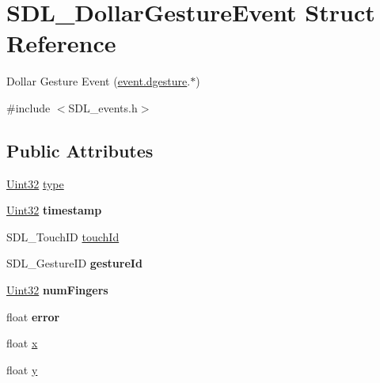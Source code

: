 \hypertarget{struct_s_d_l___dollar_gesture_event}{}\section{S\+D\+L\+\_\+\+Dollar\+Gesture\+Event Struct Reference}
\label{struct_s_d_l___dollar_gesture_event}


Dollar Gesture Event (\hyperlink{union_s_d_l___event_a4481167b9f8549aeb254e97ca812e74d}{event.\+dgesture}.$\ast$)  




{\ttfamily \#include $<$S\+D\+L\+\_\+events.\+h$>$}

\subsection*{Public Attributes}
\begin{DoxyCompactItemize}
\item 
\hyperlink{_s_d_l__stdinc_8h_add440eff171ea5f55cb00c4a9ab8672d}{Uint32} \hyperlink{struct_s_d_l___dollar_gesture_event_ac7f6948754a1b2eb36edde043bf75ce9}{type}
\item 
\hypertarget{struct_s_d_l___dollar_gesture_event_a3bccd8ebdf30b79c0f4074f6471ec583}{}\hyperlink{_s_d_l__stdinc_8h_add440eff171ea5f55cb00c4a9ab8672d}{Uint32} {\bfseries timestamp}\label{struct_s_d_l___dollar_gesture_event_a3bccd8ebdf30b79c0f4074f6471ec583}

\item 
S\+D\+L\+\_\+\+Touch\+I\+D \hyperlink{struct_s_d_l___dollar_gesture_event_a40402f6911ed0dba48e6b23aa02bd83d}{touch\+Id}
\item 
\hypertarget{struct_s_d_l___dollar_gesture_event_a68968438eae9e58208b14e8c954dec31}{}S\+D\+L\+\_\+\+Gesture\+I\+D {\bfseries gesture\+Id}\label{struct_s_d_l___dollar_gesture_event_a68968438eae9e58208b14e8c954dec31}

\item 
\hypertarget{struct_s_d_l___dollar_gesture_event_a14160d8bad8569f53dd18ed8f64d253f}{}\hyperlink{_s_d_l__stdinc_8h_add440eff171ea5f55cb00c4a9ab8672d}{Uint32} {\bfseries num\+Fingers}\label{struct_s_d_l___dollar_gesture_event_a14160d8bad8569f53dd18ed8f64d253f}

\item 
\hypertarget{struct_s_d_l___dollar_gesture_event_a30aaa8fe0df93615e6692aa20e9c13eb}{}float {\bfseries error}\label{struct_s_d_l___dollar_gesture_event_a30aaa8fe0df93615e6692aa20e9c13eb}

\item 
float \hyperlink{struct_s_d_l___dollar_gesture_event_a9888449bd8842ed96494b4db16a6097b}{x}
\item 
float \hyperlink{struct_s_d_l___dollar_gesture_event_a293b2303acc1cfc63c167c5525e6eab5}{y}
\end{DoxyCompactItemize}


